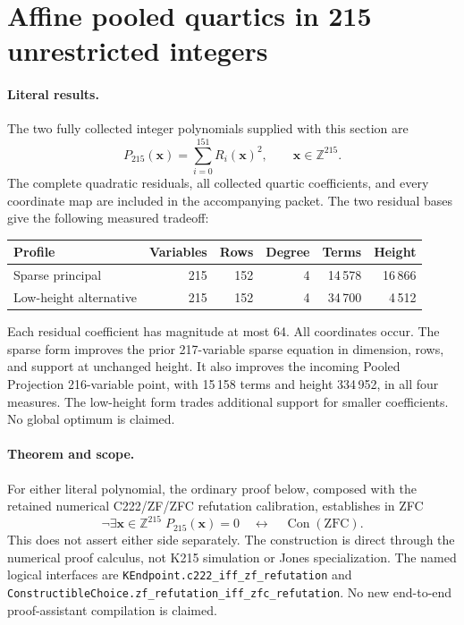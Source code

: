 \section{Affine pooled quartics in 215 unrestricted integers}
\label{sec:affine-pooled215}

\paragraph{Literal results.}
The two fully collected integer polynomials supplied with this section are
\[
 P_{215}(\boldsymbol x)=\sum_{i=0}^{151}R_i(\boldsymbol x)^2,
 \qquad \boldsymbol x\in\mathbb Z^{215}.
\]
The complete quadratic residuals, all collected quartic coefficients, and every
coordinate map are included in the accompanying packet.  The two residual
bases give the following measured tradeoff:
\begin{center}
\begin{tabular}{lrrrrr}
\hline
Profile & Variables & Rows & Degree & Terms & Height\\\hline
Sparse principal &215&152&4&14\,578&16\,866\\
Low-height alternative&215&152&4&34\,700&4\,512\\\hline
\end{tabular}
\end{center}
Each residual coefficient has magnitude at most 64.  All coordinates occur.
The sparse form improves the prior 217-variable sparse equation in dimension,
rows, and support at unchanged height.  It also improves the incoming
Pooled Projection 216-variable point, with 15\,158 terms and height 334\,952,
in all four measures.  The low-height form trades additional support for
smaller coefficients.  No global optimum is claimed.

\paragraph{Theorem and scope.}
For either literal polynomial, the ordinary proof below, composed with the
retained numerical C222/ZF/ZFC refutation calibration, establishes in ZFC
\[
 \neg\exists\boldsymbol x\in\mathbb Z^{215}\;P_{215}(\boldsymbol x)=0
 \quad\longleftrightarrow\quad\operatorname{Con}(\mathrm{ZFC}).
\]
This does not assert either side separately.  The construction is direct
through the numerical proof calculus, not K215 simulation or Jones
specialization.  The named logical interfaces are
\texttt{KEndpoint.c222\_iff\_zf\_refutation} and
\texttt{ConstructibleChoice.zf\_refutation\_iff\_zfc\_refutation}.
No new end-to-end proof-assistant compilation is claimed.


